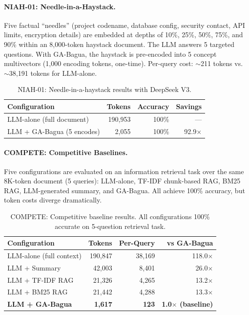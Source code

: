 \documentclass[11pt,a4paper]{article}
\begin{document}
\paragraph{NIAH-01: Needle-in-a-Haystack.} Five factual ``needles'' (project
codename, database config, security contact, API limits, encryption details)
are embedded at depths of 10\%, 25\%, 50\%, 75\%, and 90\% within an
8,000-token haystack document. The LLM answers 5 targeted questions. With
GA-Bagua, the haystack is pre-encoded into 5 concept multivectors (1,000
encoding tokens, one-time). Per-query cost: $\sim$211 tokens vs.
$\sim$38,191 tokens for LLM-alone.

\begin{table}[ht]
\centering
\caption{NIAH-01: Needle-in-a-haystack results with DeepSeek V3.}
\label{tab:niah}
\begin{tabular}{lrrr}
\toprule
\textbf{Configuration} & \textbf{Tokens} & \textbf{Accuracy} & \textbf{Savings} \\
\midrule
LLM-alone (full document)    & 190,953  & 100\% & --- \\
LLM + GA-Bagua (5 encodes)   &   2,055  & 100\% & 92.9$\times$ \\
\bottomrule
\end{tabular}
\end{table}

\paragraph{COMPETE: Competitive Baselines.} Five configurations are evaluated
on an information retrieval task over the same 8K-token document (5 queries):
LLM-alone, TF-IDF chunk-based RAG, BM25 RAG, LLM-generated summary, and
GA-Bagua. All achieve 100\% accuracy, but token costs diverge dramatically.

\begin{table}[ht]
\centering
\caption{COMPETE: Competitive baseline results. All configurations 100\%
accurate on 5-question retrieval task.}
\label{tab:compete}
\begin{tabular}{lrrr}
\toprule
\textbf{Configuration} & \textbf{Tokens} & \textbf{Per-Query} & \textbf{vs GA-Bagua} \\
\midrule
LLM-alone (full context)    & 190,847  & 38,169  & 118.0$\times$ \\
LLM + Summary               &  42,003  &  8,401  &  26.0$\times$ \\
LLM + TF-IDF RAG            &  21,326  &  4,265  &  13.2$\times$ \\
LLM + BM25 RAG              &  21,442  &  4,288  &  13.3$\times$ \\
\textbf{LLM + GA-Bagua}     & \textbf{1,617}  & \textbf{123}   & \textbf{1.0$\times$ (baseline)} \\
\bottomrule
\end{tabular}
\end{table}
\end{document}
